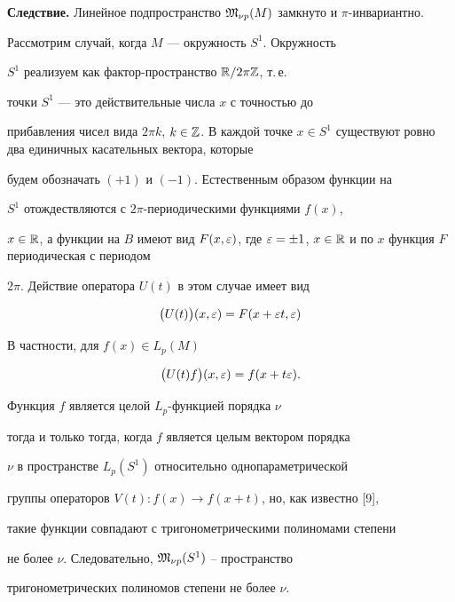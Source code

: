 {\bf Следствие.} Линейное подпространство $\Mg_{\nu


p}(M)$ замкнуто и $\pi$-инвариантно.


\medskip





Рассмотрим случай, когда $M$ --- окружность $S^1$. Окружность


$S^1$ реализуем как фактор-пространство $\Bbb R/2\pi\Bbb Z$, т.\,е.


точки $S^1$ --- это действительные числа $x$ с точностью до


прибавления чисел вида $2\pi k$, $k\in\Za$. В каждой точке $x\in


S^1$ существуют ровно два единичных касательных вектора, которые


будем обозначать $(+1)$ и $(-1)$. Естественным образом функции на


$S^1$ отождествляются с $2\pi$-периодическими функциями $f(x)$,


$x\in\Ra$, а функции на $B$ имеют вид $F(x,\ep)$, где $\ep=\pm


1$, $x\in\Ra$ и по $x$ функция $F$ периодическая с периодом


$2\pi$. Действие оператора $U(t)$ в этом случае имеет вид


$$


\bl U(t)\br(x,\ep)=F(x+\ep t,\ep)


$$


В частности, для $f(x)\in L_p(M)$


$$


\bl U(t)f\br(x,\ep)=f(x+t\ep).


$$





Функция $f$ является целой $L_p$-функцией порядка $\nu$


тогда и только тогда, когда $f$ является целым вектором порядка


$\nu$ в пространстве $L_p(S^1)$ относительно однопараметрической


группы операторов $V(t):f(x)\to f(x+t)$, но, как известно [9],


такие функции совпадают с тригонометрическими полиномами степени


не более $\nu$. Следовательно, $\frak M_{\nu p}(S^1)$ -- пространство


тригонометрических полиномов степени не более $\nu$.





